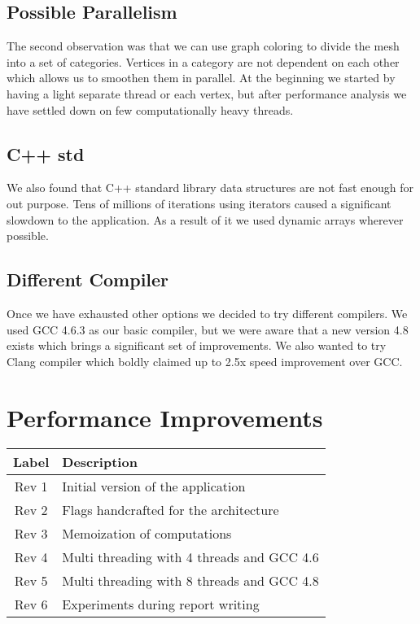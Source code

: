 \documentclass[conference]{IEEEtran}
\begin{document}
\subsection{Possible Parallelism}
The second observation was that we can use graph coloring to divide the mesh into a set of categories. Vertices in a category are not dependent on each other which allows us to smoothen them in parallel. At the beginning we started by having a light separate thread or each vertex, but after performance analysis we have settled down on few computationally heavy threads.

\subsection{C++ std}
We also found that C++ standard library data structures are not fast enough for out purpose. Tens of millions of iterations using iterators caused a significant slowdown to the application. As a result of it we used dynamic arrays wherever possible.

\subsection{Different Compiler}
Once we have exhausted other options we decided to try different compilers. We used GCC 4.6.3 as our basic compiler, but we were aware that a new version 4.8 exists which brings a significant set of improvements. We also wanted to try Clang compiler which boldly claimed up to 2.5x speed improvement over GCC.

\section{Performance Improvements}

\begin{tabular}{ |c|l| }
  \hline
  \textbf{Label} & \textbf{Description} \\ \hline
  Rev 1 & Initial version of the application \\ \hline
  Rev 2 & Flags handcrafted for the architecture \\ \hline
  Rev 3 & Memoization of computations \\ \hline
  Rev 4 & Multi threading with 4 threads and GCC 4.6 \\ \hline
  Rev 5 & Multi threading with 8 threads and GCC 4.8 \\ \hline
  Rev 6 & Experiments during report writing \\ \hline
\end{tabular}
\end{document}
